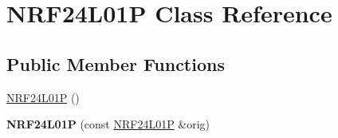 \hypertarget{classNRF24L01P}{\section{N\-R\-F24\-L01\-P Class Reference}
\label{classNRF24L01P}
}
\subsection*{Public Member Functions}
\begin{DoxyCompactItemize}
\item 
\hyperlink{classNRF24L01P_a3263473af7bb851bfbc1d9ddff986acb}{N\-R\-F24\-L01\-P} ()
\item 
\hypertarget{classNRF24L01P_aa59da9b36e8d0c17ae37d35c8dcd9713}{{\bfseries N\-R\-F24\-L01\-P} (const \hyperlink{classNRF24L01P}{N\-R\-F24\-L01\-P} \&orig)}\label{classNRF24L01P_aa59da9b36e8d0c17ae37d35c8dcd9713}


\end{DoxyCompactItemize}
